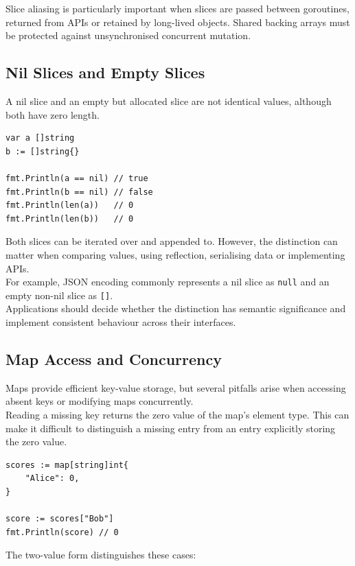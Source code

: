 Slice aliasing is particularly important when slices are passed between goroutines, returned from APIs or retained by long-lived objects. Shared backing arrays must be protected against unsynchronised concurrent mutation.

\subsection{Nil Slices and Empty Slices}

A nil slice and an empty but allocated slice are not identical values, although both have zero length.

\begin{lstlisting}
var a []string
b := []string{}

fmt.Println(a == nil) // true
fmt.Println(b == nil) // false
fmt.Println(len(a))   // 0
fmt.Println(len(b))   // 0
\end{lstlisting}

Both slices can be iterated over and appended to. However, the distinction can matter when comparing values, using reflection, serialising data or implementing APIs.\\

For example, JSON encoding commonly represents a nil slice as \texttt{null} and an empty non-nil slice as \texttt{[]}.\\

Applications should decide whether the distinction has semantic significance and implement consistent behaviour across their interfaces.

\subsection{Map Access and Concurrency}

Maps provide efficient key-value storage, but several pitfalls arise when accessing absent keys or modifying maps concurrently.\\

Reading a missing key returns the zero value of the map's element type. This can make it difficult to distinguish a missing entry from an entry explicitly storing the zero value.

\begin{lstlisting}
scores := map[string]int{
    "Alice": 0,
}

score := scores["Bob"]
fmt.Println(score) // 0
\end{lstlisting}

The two-value form distinguishes these cases:

